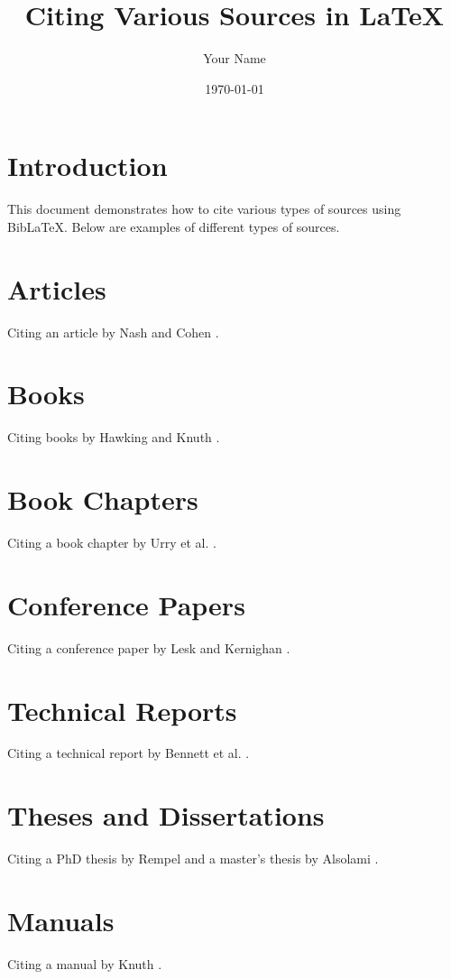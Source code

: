 \documentclass{article}
\title{Citing Various Sources in LaTeX}
\author{Your Name}
\date{\today}
\begin{document}
\maketitle

\section{Introduction}

This document demonstrates how to cite various types of sources using BibLaTeX. Below are examples of different types of sources.

\section{Articles}
Citing an article by Nash \cite{nash51} and Cohen \cite{cohen63}.

\section{Books}
Citing books by Hawking \cite{hawking1988} and Knuth \cite{texbook}.

\section{Book Chapters}
Citing a book chapter by Urry et al. \cite{urry2016}.

\section{Conference Papers}
Citing a conference paper by Lesk and Kernighan \cite{lesk1977}.

\section{Technical Reports}
Citing a technical report by Bennett et al. \cite{wasatch2018}.

\section{Theses and Dissertations}
Citing a PhD thesis by Rempel \cite{rempel1956} and a master's thesis by Alsolami \cite{alsolami2012}.

\section{Manuals}
Citing a manual by Knuth \cite{texbook_manual}.
\end{document}
